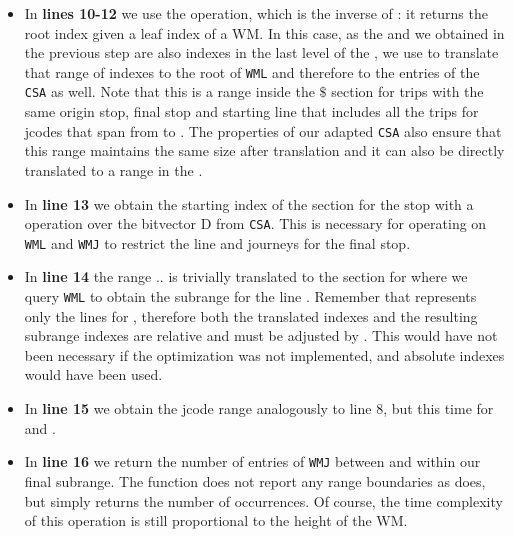 \documentclass[runningheads]{llncs}
\begin{document}
\begin{itemize}
    \item In \textbf{lines 10-12} we use the  operation, which is the inverse of : it returns the root index given a leaf index of a WM. In this case, as the  and  we obtained in the previous step are also indexes in the last level of the , we use  to translate that range of indexes to the root of \texttt{WML} and therefore to the entries of the \texttt{CSA} as well. Note that this is a range inside the $\$$ section for trips with the same origin stop, final stop and starting line that includes all the trips for jcodes that span from  to . The properties of our adapted \texttt{CSA} also ensure that this range maintains the same size after translation and it can also be directly translated to a range in the .
    
    \item In \textbf{line 13} we obtain the starting index of the section for the stop  with a  operation over the bitvector D from \texttt{CSA}. This is necessary for operating on \texttt{WML} and \texttt{WMJ} to restrict the line and journeys for the final stop.
    
    \item In \textbf{line 14} the range $..$ is trivially translated to the section for  where we query \texttt{WML} to obtain the subrange for the line . Remember that  represents only the lines for , therefore both the translated indexes and the resulting subrange indexes are relative and must be adjusted by . This would have not been necessary if the optimization was not implemented, and absolute indexes would have been used.
    
    \item In \textbf{line 15} we obtain the jcode range analogously to line 8, but this time for  and .
    
    \item In \textbf{line 16} we return the number of entries of \texttt{WMJ} between  and  within our final subrange. The function  does not report any range boundaries as  does, but simply returns the number of occurrences. Of course, the time complexity of this operation is still proportional to the height of the WM.
\end{itemize}
\end{document}
